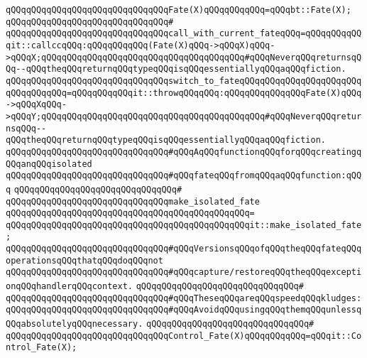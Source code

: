 \verb|qQQqqQQqqQQqqQQqqQQqqQQqqQQqqQQqFate(X)qQQqqQQqqQQq=qQQqbt::Fate(X);|\newline
\verb|qQQqqQQqqQQqqQQqqQQqqQQqqQQqqQQq#|\newline
\verb|qQQqqQQqqQQqqQQqqQQqqQQqqQQqqQQqcall_with_current_fateqQQq=qQQqqQQqqQQqit::callccqQQq:qQQqqQQqqQQq(Fate(X)qQQq->qQQqX)qQQq->qQQqX;qQQqqQQqqQQqqQQqqQQqqQQqqQQqqQQqqQQqqQQq#qQQqNeverqQQqreturnsqQQq--qQQqtheqQQqreturnqQQqtypeqQQqisqQQqessentiallyqQQqaqQQqfiction.|\newline
\verb|qQQqqQQqqQQqqQQqqQQqqQQqqQQqqQQqswitch_to_fateqQQqqQQqqQQqqQQqqQQqqQQqqQQqqQQqqQQq=qQQqqQQqqQQqit::throwqQQqqQQq:qQQqqQQqqQQqqQQqFate(X)qQQq->qQQqXqQQq->qQQqY;qQQqqQQqqQQqqQQqqQQqqQQqqQQqqQQqqQQqqQQqqQQq#qQQqNeverqQQqreturnsqQQq--qQQqtheqQQqreturnqQQqtypeqQQqisqQQqessentiallyqQQqaqQQqfiction.|\newline
\newline
\newline
\verb|qQQqqQQqqQQqqQQqqQQqqQQqqQQqqQQq#qQQqAqQQqfunctionqQQqforqQQqcreatingqQQqanqQQqisolated|\newline
\verb|qQQqqQQqqQQqqQQqqQQqqQQqqQQqqQQq#qQQqfateqQQqfromqQQqaqQQqfunction:qQQq|\newline
\verb|qQQqqQQqqQQqqQQqqQQqqQQqqQQqqQQq#|\newline
\verb|qQQqqQQqqQQqqQQqqQQqqQQqqQQqqQQqmake_isolated_fate|\newline
\verb|qQQqqQQqqQQqqQQqqQQqqQQqqQQqqQQqqQQqqQQqqQQqqQQq=|\newline
\verb|qQQqqQQqqQQqqQQqqQQqqQQqqQQqqQQqqQQqqQQqqQQqqQQqit::make_isolated_fate;|\newline
\newline
\newline
\verb|qQQqqQQqqQQqqQQqqQQqqQQqqQQqqQQq#qQQqVersionsqQQqofqQQqtheqQQqfateqQQqoperationsqQQqthatqQQqdoqQQqnot|\newline
\verb|qQQqqQQqqQQqqQQqqQQqqQQqqQQqqQQq#qQQqcapture/restoreqQQqtheqQQqexceptionqQQqhandlerqQQqcontext.|\newline
\verb|qQQqqQQqqQQqqQQqqQQqqQQqqQQqqQQq#|\newline
\verb|qQQqqQQqqQQqqQQqqQQqqQQqqQQqqQQq#qQQqTheseqQQqareqQQqspeedqQQqkludges:|\newline
\verb|qQQqqQQqqQQqqQQqqQQqqQQqqQQqqQQq#qQQqAvoidqQQqusingqQQqthemqQQqunlessqQQqabsolutelyqQQqnecessary.|\newline
\verb|qQQqqQQqqQQqqQQqqQQqqQQqqQQqqQQq#|\newline
\verb|qQQqqQQqqQQqqQQqqQQqqQQqqQQqqQQqControl_Fate(X)qQQqqQQqqQQq=qQQqit::Control_Fate(X);|\newline
